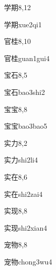 \begin{entry}{学期}{8,12}
  \begin{phonetics}{学期}{xue2qi1}
  \end{phonetics}
\end{entry}

\begin{entry}{官桂}{8,10}
  \begin{phonetics}{官桂}{guan1gui4}
  \end{phonetics}
\end{entry}

\begin{entry}{宝石}{8,5}
  \begin{phonetics}{宝石}{bao3shi2}
  \end{phonetics}
\end{entry}

\begin{entry}{宝宝}{8,8}
  \begin{phonetics}{宝宝}{bao3bao5}
  \end{phonetics}
\end{entry}

\begin{entry}{实力}{8,2}
  \begin{phonetics}{实力}{shi2li4}
  \end{phonetics}
\end{entry}

\begin{entry}{实在}{8,6}
  \begin{phonetics}{实在}{shi2zai4}
  \end{phonetics}
\end{entry}

\begin{entry}{实现}{8,8}
  \begin{phonetics}{实现}{shi2xian4}
  \end{phonetics}
\end{entry}

\begin{entry}{宠物}{8,8}
  \begin{phonetics}{宠物}{chong3wu4}
  \end{phonetics}
\end{entry}

